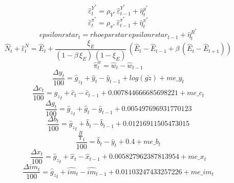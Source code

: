\begin{dmath}
{\hat{\varepsilon}^{Y^*}_{t}}={{\rho_{Y^*}}}\, {\hat{\varepsilon}^{Y^*}_{t-1}}+{\hat{\eta}^{y^*}_{t}}
\end{dmath}
\begin{dmath}
{\hat{\varepsilon}^{\pi^*}_{t}}={{\rho_{\pi^*}}}\, {\hat{\varepsilon}^{\pi^*}_{t-1}}+{\hat{\eta}^{\pi^*}_{t}}
\end{dmath}
\begin{dmath}
{epsilonrstar_{t}}={rhoepsrstar}\, {epsilonrstar_{t-1}}+{\hat{\eta}^{R^*}_{t}}
\end{dmath}
\begin{dmath}
{\hat{N}_{t}}+{\hat{\varepsilon}^N_{t}}={\hat{E}_{t}}+\frac{{\xi_E}}{\left(1-{\beta}\, {\xi_E}\right)\, \left(1-{\xi_E}\right)}\, \left({\hat{E}_{t}}-{\hat{E}_{t-1}}+{\beta}\, \left({\hat{E}_{t}}-{\hat{E}_{t+1}}\right)\right)
\end{dmath}
\begin{dmath}
{\hat{\pi}^w_{t}}={\hat{w}_{t}}-{\hat{w}_{t-1}}
\end{dmath}
\begin{dmath}
\frac{{\Delta{y}_{t}}}{100}={{\hat{g}_z}_{t}}+{\hat{y}_{t}}-{\hat{y}_{t-1}}+log\left({\bar{gz}}\right)+{me\_y_{t}}
\end{dmath}
\begin{dmath}
\frac{{\Delta{c}_{t}}}{100}={{\hat{g}_z}_{t}}+{\hat{c}_{t}}-{\hat{c}_{t-1}}+0.007844666685698221+{me\_c_{t}}
\end{dmath}
\begin{dmath}
\frac{{\Delta{g}_{t}}}{100}={{\hat{g}_z}_{t}}+{\hat{g}_{t}}-{\hat{g}_{t-1}}+0.005497696931770123
\end{dmath}
\begin{dmath}
\frac{{\Delta{b}_{t}}}{100}={{\hat{g}_z}_{t}}+{\hat{b}_{t}}-{\hat{b}_{t-1}}+0.01216911505473015
\end{dmath}
\begin{dmath}
\frac{{\frac{B}{Y}_{t}}}{100}={\hat{b}_{t}}-{\hat{y}_{t}}+0.4+{me\_b_{t}}
\end{dmath}
\begin{dmath}
\frac{{\Delta{x}_{t}}}{100}={{\hat{g}_z}_{t}}+{\hat{x}_{t}}-{\hat{x}_{t-1}}+0.005827962387813954+{me\_x_{t}}
\end{dmath}
\begin{dmath}
\frac{{\Delta{im}_{t}}}{100}={{\hat{g}_z}_{t}}+{\hat{im}_{t}}-{\hat{im}_{t-1}}+0.01103247433257226+{me\_im_{t}}
\end{dmath}
